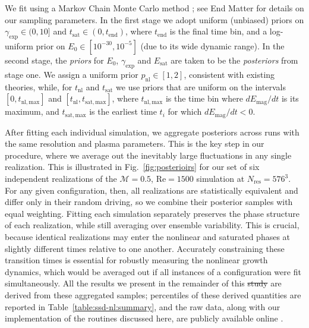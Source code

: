 \documentclass[12pt,twoside]{extreport}
\makeatletter
\newcommand{\mReh}{\ensuremath{\mathrm{Re}}} %
\newcommand{\mSonicMach}{\ensuremath{\mathcal{M}}} %
\providecommand{\DIFaddtex}[1]{{\protect\color{DIFgreen}\uwave{#1}}} %
\providecommand{\DIFdeltex}[1]{{\protect\color{DIFpurple}\sout{#1}}} %
\providecommand{\DIFaddbegin}{} %
\providecommand{\DIFaddend}{} %
\providecommand{\DIFdelbegin}{} %
\providecommand{\DIFdelend}{} %
\providecommand{\DIFadd}[1]{\texorpdfstring{\DIFaddtex{#1}}{#1}} %
\providecommand{\DIFdel}[1]{\texorpdfstring{\DIFdeltex{#1}}{}} %
\providecommand{\DIFscaledelfig}{0.5}
\newlength{\DIFdelgraphicswidth} %
\newlength{\DIFdelgraphicsheight} %
\providecommand{\DIFaddincludegraphics}[2][]{{\color{DIFgreen}\fbox{\DIFOincludegraphics[#1]{#2}}}} %
\providecommand{\DIFdelincludegraphics}[2][]{%
\sbox{\DIFdelgraphicsbox}{\DIFOincludegraphics[#1]{#2}}%
\settoboxwidth{\DIFdelgraphicswidth}{\DIFdelgraphicsbox} %
\settoboxtotalheight{\DIFdelgraphicsheight}{\DIFdelgraphicsbox} %
\scalebox{\DIFscaledelfig}{%
\parbox[b]{\DIFdelgraphicswidth}{\usebox{\DIFdelgraphicsbox}\\[-\baselineskip] \rule{\DIFdelgraphicswidth}{0em}}\llap{\resizebox{\DIFdelgraphicswidth}{\DIFdelgraphicsheight}{%
\setlength{\unitlength}{\DIFdelgraphicswidth}%
\begin{picture}(1,1)%
\thicklines\linethickness{2pt} %
{\color{DIFpurple}\put(0,0){\framebox(1,1){}}}%
{\color{DIFpurple}\put(0,0){\line( 1,1){1}}}%
{\color{DIFpurple}\put(0,1){\line(1,-1){1}}}%
\end{picture}%
}\hspace*{3pt}}} %
} %
\DeclareRobustCommand{\DIFaddbegin}{\DIFOaddbegin \let\includegraphics\DIFaddincludegraphics} %
\DeclareRobustCommand{\DIFaddend}{\DIFOaddend \let\includegraphics\DIFOincludegraphics} %
\DeclareRobustCommand{\DIFdelbegin}{\DIFOdelbegin \let\includegraphics\DIFdelincludegraphics} %
\DeclareRobustCommand{\DIFdelend}{\DIFOaddend \let\includegraphics\DIFOincludegraphics} %
\let\sout@orig\sout %
\renewcommand{\sout}[1]{\ifmmode\text{\sout@orig{\ensuremath{#1}}}\else\sout@orig{#1}\fi} %
\makeatother
\begin{document}
    We fit using a Markov Chain Monte Carlo method \cite{Foreman-Mackey13a}; see End Matter \DIFaddbegin \DIFadd{(\S\ref{app:ssd-nl:mcmc}) }\DIFaddend for details on our sampling parameters. In the first stage we adopt uniform (unbiased) priors on $\gamma_\mathrm{exp} \in (0, 10]$ and $t_\mathrm{sat} \in (0, t_\mathrm{end})$, where $t_\mathrm{end}$ is the final time bin, and a log-uniform prior on $E_0 \in [10^{-30}, 10^{-5}]$ (due to its wide dynamic range). In the second stage, the \textit{priors} for $E_0$, $\gamma_\mathrm{exp}$ and $E_\mathrm{sat}$ are taken to be the \textit{posteriors} from stage one. We assign a uniform prior $p_\mathrm{nl} \in [1,2]$, consistent with existing theories, while, for $t_\mathrm{nl}$ and $t_\mathrm{sat}$ we use priors that are uniform on the intervals $[0,t_{\mathrm{nl}, \mathrm{max}}]$ and $[t_\mathrm{nl},t_{\mathrm{sat},\mathrm{max}}]$, where $t_{\mathrm{nl}, \mathrm{max}}$ is the time bin where $dE_\mathrm{mag}/dt$ is its maximum, and $t_{\mathrm{sat},\mathrm{max}}$ is the earliest time $t_i$ for which $dE_\mathrm{mag}/dt < 0$.

    After fitting each individual simulation, we aggregate posteriors across runs with the same resolution and plasma parameters. This is the key step in our procedure, where we average out the inevitably large fluctuations in any single realization. This is illustrated in Fig.~\ref{fig:posterioirs} for our set of six independent realizations of the $\mSonicMach = 0.5$, $\mReh = 1500$ simulation at $N_\mathrm{res} = 576^3$. For any given configuration, then, all realizations are statistically equivalent and differ only in their random driving, so we combine their posterior samples with equal weighting. Fitting each simulation separately preserves the phase structure of each realization, while still averaging over ensemble variability. This is crucial, because identical realizations may enter the nonlinear and saturated phases at slightly different times relative to one another. Accurately constraining these transition times is essential for robustly measuring the nonlinear growth dynamics, which would be averaged out if all instances of a configuration were fit simultaneously. All the results we present in the remainder of this \DIFdelbegin \DIFdel{study }\DIFdelend \DIFaddbegin \DIFadd{chapter }\DIFaddend are derived from these aggregated samples; percentiles of these derived quantities are reported in Table~\ref{table:ssd-nl:summary}, and the raw data, along with our implementation of the routines discussed here, are publicly available online \citep{mydata}.
\end{document}

